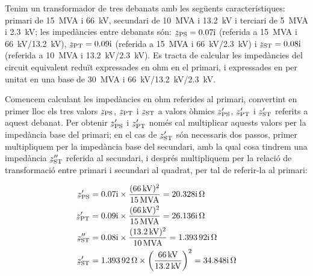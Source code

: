 \begin{exemple}
    Tenim un transformador de tres debanats amb les següents característiques: primari de \qty{15}{MVA} i \qty{66}{kV}, secundari de \qty{10}{MVA} i \qty{13,2}{kV} i terciari de \qty{5}{MVA} i \qty{2,3}{kV}; les impedàncies entre debanats són: $\cmplx{z}\ped{PS} = \complexnum{j 0,07}$ (referida a \qty{15}{MVA} i \qty{66}{kV}/\qty{13,2}{kV}), $\cmplx{z}\ped{PT} = \complexnum{j 0,09}$ (referida a \qty{15}{MVA} i \qty{66}{kV}/\qty{2,3}{kV}) i $\cmplx{z}\ped{ST} = \complexnum{j 0,08}$ (referida a \qty{10}{MVA} i \qty{13,2}{kV}/\qty{2,3}{kV}).  Es tracta de calcular les impedàncies del circuit equivalent reduït expressades en ohm en el primari, i expressades en per unitat en una base de \qty{30}{MVA} i \qty{66}{kV}/\qty{13,2}{kV}/\qty{2,3}{kV}.

    Comencem calculant les impedàncies en ohm referides al primari, convertint en primer lloc els tres valors $\cmplx{z}\ped{PS}$, $\cmplx{z}\ped{PT}$ i $\cmplx{z}\ped{ST}$ a valors òhmics $\cmplx{z}\ped{PS}'$, $\cmplx{z}\ped{PT}'$ i $\cmplx{z}\ped{ST}'$ referits a aquest debanat. Per obtenir $\cmplx{z}\ped{PS}'$ i $\cmplx{z}\ped{PT}'$ només cal multiplicar aquests valors per la impedància base del primari; en el cas de $\cmplx{z}\ped{ST}'$ són necessaris dos passos, primer multipliquem per la impedància base del secundari, amb la qual cosa tindrem una impedància $\cmplx{z}\ped{ST}''$ referida al secundari,  i després multipliquem per la relació de transformació entre primari i secundari al quadrat, per tal de referir-la al primari:

    \begin{align*}
        \cmplx{z}\ped{PS}' &=  \complexnum{j 0,07} \times \frac{(\qty{66}{kV})^2}{\qty{15}{MVA}} = \complexqty{j 20,328}{\ohm}\\
        \cmplx{z}\ped{PT}' &=  \complexnum{j 0,09} \times \frac{(\qty{66}{kV})^2}{\qty{15}{MVA}} = \complexqty{j 26,136}{\ohm}\\
        \cmplx{z}\ped{ST}'' &= \complexnum{j 0,08} \times \frac{(\qty{13,2}{kV})^2}{\qty{10}{MVA}} = \complexqty{j 1,39392}{\ohm}\\
        \cmplx{z}\ped{ST}' &=  \qty{1,39392}{\ohm} \times {\left(\frac{\qty{66}{kV}}{\qty{13,2}{kV}}\right)}^2 = \complexqty{j 34,848}{\ohm}
    \end{align*}


\end{exemple}
